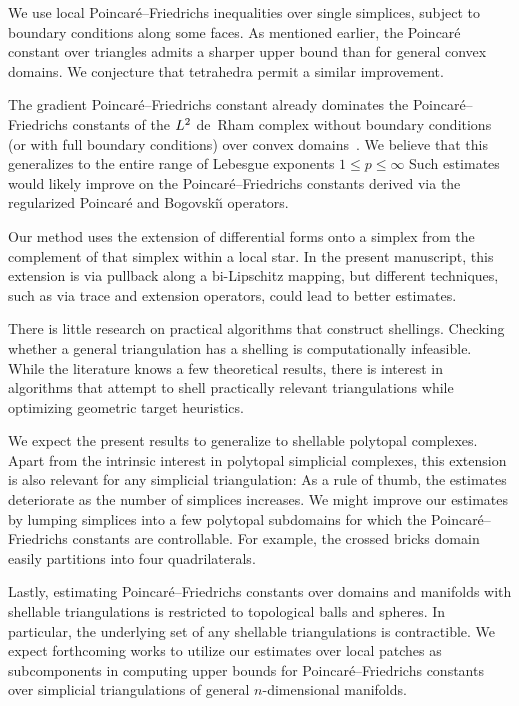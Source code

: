 \documentclass[10pt,a4paper]{article}
\begin{document}
We use local Poincar\'e--Friedrichs inequalities over single simplices, subject to boundary conditions along some faces. As mentioned earlier, the Poincar\'e constant over triangles admits a sharper upper bound than for general convex domains. We conjecture that tetrahedra permit a similar improvement. 

The gradient Poincar\'e--Friedrichs constant already dominates the Poincar\'e--Friedrichs constants of the $L^2$ de~Rham complex without boundary conditions (or with full boundary conditions) over convex domains~\cite{guerini2004eigenvalue,licht2024geometry}. 
We believe that this generalizes to the entire range of Lebesgue exponents $1 \leq p \leq \infty$
Such estimates would likely improve on the Poincar\'e--Friedrichs constants derived via the regularized Poincar\'e and Bogovski\u{\i} operators.

Our method uses the extension of differential forms onto a simplex from the complement of that simplex within a local star. 
In the present manuscript, this extension is via pullback along a bi-Lipschitz mapping, but different techniques, such as via trace and extension operators, could lead to better estimates.

There is little research on practical algorithms that construct shellings. Checking whether a general triangulation has a shelling is computationally infeasible. While the literature knows a few theoretical results, there is interest in algorithms that attempt to shell practically relevant triangulations while optimizing geometric target heuristics.

We expect the present results to generalize to shellable polytopal complexes. 
Apart from the intrinsic interest in polytopal simplicial complexes, this extension is also relevant for any simplicial triangulation:
As a rule of thumb, the estimates deteriorate as the number of simplices increases.
We might improve our estimates by lumping simplices into a few polytopal subdomains for which the Poincar\'e--Friedrichs constants are controllable. For example, the crossed bricks domain easily partitions into four quadrilaterals.

Lastly, estimating Poincar\'e--Friedrichs constants over domains and manifolds with shellable triangulations is restricted to topological balls and spheres. 
In particular, the underlying set of any shellable triangulations is contractible. 
We expect forthcoming works to utilize our estimates over local patches as subcomponents in computing upper bounds for Poincar\'e--Friedrichs constants over simplicial triangulations of general $n$-dimensional manifolds. 
\end{document}
